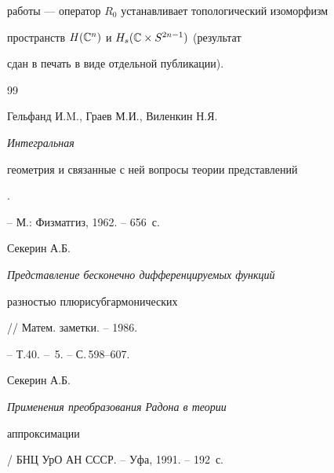 работы --- оператор $R_0$ устанавливает топологический изоморфизм 


пространств $H(\Bbb C^n)$ и $ H_s(\Bbb C\times S^{2n-1})$ (результат 


сдан в печать в виде отдельной публикации).








\begin{thebibliography}{99}







Гельфанд И.M., Граев М.И., Виленкин Н.Я. {\em Интегральная 


геометрия и связанные с ней вопросы теории представлений}.


-- М.: Физматгиз, 1962. -- 656~с.




Секерин А.Б. {\em Представление бесконечно дифференцируемых функций 


разностью плюрисубгармонических} // Матем. заметки. -- 1986. 


-- Т.40. -- \No\,5. -- С.\,598--607.




Секерин А.Б. {\em Применения преобразования Радона в теории 


аппроксимации} / БНЦ УрО АН СССР. -- Уфа, 1991. -- 192~с.








\end{thebibliography}





\vskip 2cm














\label{end}





